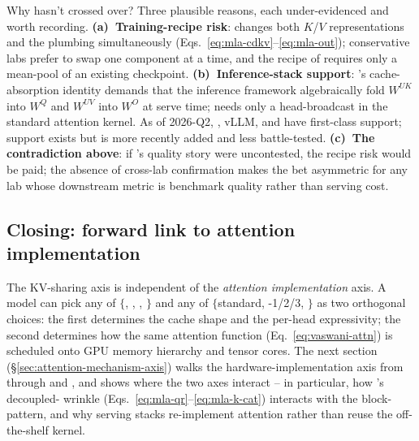 Why hasn't  crossed over? Three plausible reasons, each
under-evidenced and worth recording. \textbf{(a)~Training-recipe
risk}:  changes both $K$/$V$ representations and the 
plumbing simultaneously (Eqs.~\eqref{eq:mla-cdkv}--\eqref{eq:mla-out});
conservative labs prefer to swap one component at a time, and the
 recipe of \citet{ainslie2023} requires only a mean-pool of an
existing checkpoint. \textbf{(b)~Inference-stack support}: 's
cache-absorption identity demands that the inference framework
algebraically fold $W^{UK}$ into $W^Q$ and $W^{UV}$ into $W^O$ at
serve time;  needs only a head-broadcast in the standard
attention kernel. As of 2026-Q2, , vLLM, and 
have first-class  support;  support exists but is more
recently added and less battle-tested. \textbf{(c)~The contradiction
above}: if 's quality story were uncontested, the recipe risk
would be paid; the absence of cross-lab confirmation makes the bet
asymmetric for any lab whose downstream metric is benchmark
quality rather than serving cost.

\subsection{Closing: forward link to attention implementation}
\label{sec:attn-summary}

The KV-sharing axis is independent of the \emph{attention
implementation} axis. A model can pick any of $\{$, , ,
$\}$ and any of $\{$standard, -1/2/3, $\}$ as
two orthogonal choices: the first determines the cache shape and
the per-head expressivity; the second determines how the same
attention function (Eq.~\eqref{eq:vaswani-attn}) is scheduled onto
GPU memory hierarchy and tensor cores. The next section
(\S\ref{sec:attention-mechanism-axis}) walks the
hardware-implementation axis from \citet{dao2022} through
\citet{shah2024} and \citet{yuan2025}, and shows where the two axes
interact -- in particular, how 's decoupled- wrinkle
(Eqs.~\eqref{eq:mla-qr}--\eqref{eq:mla-k-cat}) interacts with the
 block- pattern, and why  serving stacks
re-implement attention rather than reuse the off-the-shelf 
kernel.

